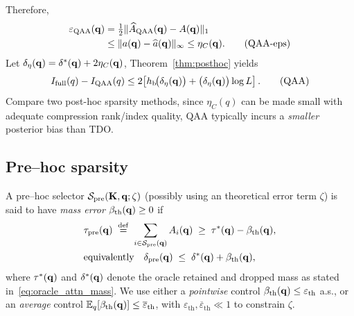 Therefore,
\begin{align}
    \varepsilon_{\text{QAA}}(\mathbf{q})&=\tfrac12\|\widehat A_{\text{QAA}}(\mathbf{q})-A(\mathbf{q})\|_1 \nonumber \\
    & \le \|a(\mathbf{q})-\widehat a(\mathbf{q})\|_\infty
    \le \eta_C(\mathbf{q}).
\tag{QAA-eps}
\end{align}
Let $\delta_\eta(\mathbf{q})=\delta^{*}(\mathbf{q})+2\eta_C(\mathbf{q})$, Theorem~\ref{thm:posthoc} yields
\begin{align}
\label{QAA}
    I_{\mathrm{full}}(q)-I_{\text{QAA}}(q) \le 2\!\left[ h_{\mathrm b}\!\big(\delta_\eta(\mathbf{q})\big)+\big(\delta_\eta(\mathbf{q})\big)\log L 
\right].
\tag{QAA}
\end{align}
Compare two post-hoc sparsity methods, since $\eta_C(q)$ can be made small with adequate compression rank/index quality, QAA typically incurs a \emph{smaller} posterior bias than TDO. 

\subsection{Pre–hoc sparsity}



\begin{definition}
\label{def:prehoc-error}
A pre--hoc selector $\mathcal S_{\mathrm{pre}}(\mathbf{K},\mathbf{q};\zeta)$ (possibly using an
theoretical error term $\zeta$) is said to have \emph{mass error} $\beta_{\mathrm{th}}(\mathbf{q})\ge 0$ if
\begin{align}
& \tau_{\mathrm{pre}}(\mathbf{q})
\;\stackrel{\mathrm{def}}{=}\;
\sum_{i\in \mathcal S_{\mathrm{pre}}(\mathbf{q})} A_i(\mathbf{q}) \;\ge\; \tau^{*}(\mathbf{q}) - \beta_{\mathrm{th}}(\mathbf{q}), \nonumber
\\ & \text{equivalently}\quad
\delta_{\mathrm{pre}}(\mathbf{q})\;\le\;\delta^{*}(\mathbf{q})+\beta_{\mathrm{th}}(\mathbf{q}),
\label{eq:prehoc-mass-error}
\end{align}
where $\tau^{*}(\mathbf{q})$ and $\delta^{*}(\mathbf{q})$ denote the oracle retained and dropped mass as stated in~\eqref{eq:oracle_attn_mass}. We use either a \emph{pointwise} control
$\beta_{\mathrm{th}}(\mathbf{q})\le \varepsilon_{\mathrm{th}}$ a.s., or an \emph{average} control
$\mathbb E_q[\beta_{\mathrm{th}}(\mathbf{q})]\le \overline\varepsilon_{\mathrm{th}}$,
with $\varepsilon_{\mathrm{th}},\overline\varepsilon_{\mathrm{th}}\ll 1$ to constrain $\zeta$.
\end{definition}


